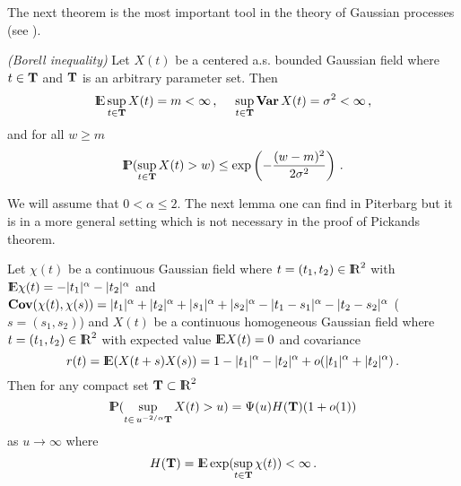 The next theorem is the most important tool in the theory of Gaussian processes (see \cite{ad:ta:04}).
\begin{theorem}\label{borel}
{\em (Borell inequality)}
Let $X(t)$ be a centered a.s. bounded Gaussian field where $t\in {\bf T}$ and ${\bf T}$ is
an arbitrary parameter set. Then
$$
{\rm I\hspace{-0.8mm}E}\sup_{t\in {\bf T}}X(t)=m< \infty\,,\,\,\,\,\,\,\,\,
\sup_{t\in {\bf T}}{\bf Var\,} X(t)=\sigma^2< \infty\,,
$$
and for all $w\geq m$
$$
{\rm I\hspace{-0.8mm}P}(\sup_{t\in {\bf T}}X(t)>w)\leq \exp\left(-\frac{(w-m)^2}{2\sigma^2}\right)\,.
$$
\end{theorem}
We will assume that $0<\alpha\leq 2$.
The next lemma one can find in Piterbarg \cite{pit:96} but it is in a more general setting which is not necessary
in the proof of Pickands theorem.
\begin{lemma}\label{lemobok}
Let $\chi(t)$ be a continuous Gaussian field where $t=(t_1,t_2)\in{\rm I\hspace{-0.8mm}R}^2$ with 
${\rm I\hspace{-0.8mm}E}\chi(t)=-|t_1|^\alpha-|t_2|^\alpha$ and ${\bf Cov}(\chi(t),\chi(s))=|t_1|^\alpha+|t_2|^\alpha+
|s_1|^\alpha+|s_2|^\alpha-|t_1-s_1|^\alpha-|t_2-s_2|^\alpha$ ($s=(s_1,s_2)$) and $X(t)$ be a continuous homogeneous Gaussian 
field where $t=(t_1,t_2)\in{\rm I\hspace{-0.8mm}R}^2$ with expected value ${\rm I\hspace{-0.8mm}E} X(t)=0$ and covariance 
$$
r(t)={\rm I\hspace{-0.8mm}E}(X(t+s)X(s))=1-|t_1|^\alpha-|t_2|^\alpha+o(|t_1|^\alpha+|t_2|^\alpha)\,.
$$
Then for any compact set ${\bf T}\subset{\rm I\hspace{-0.8mm}R}^2$
$$
{\rm I\hspace{-0.8mm}P}(\sup_{t\in\, u^{-2/\alpha}{\bf T}}X(t)>u)=\Psi(u)H({\bf T})(1+o(1))
$$
as $u\rightarrow\infty$ where
$$
H({\bf T})={\rm I\hspace{-0.8mm}E}\exp(\sup_{t\in {\bf T}}\chi(t))<\infty\,.
$$
\end{lemma}

